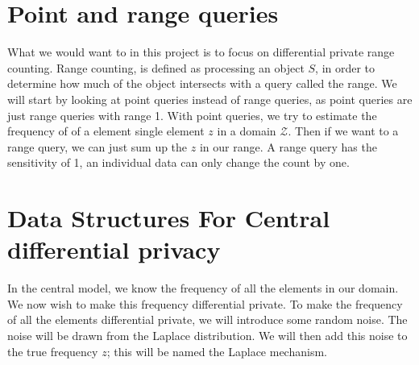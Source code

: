 \documentclass[11pt]{article}
\theoremstyle{definition}
\begin{document}
\section{Point and range queries}
What we would want to in this project is to focus on differential private range counting. Range counting, is defined as processing an object $S$, in order to determine how much of the object intersects with a query called the range. We will start by looking at point queries instead of range queries, as point queries are just range queries with range 1. With point queries, we try to estimate the frequency of of a element single element $z$ in a domain $\mathcal{Z}$. 
Then if we want to a range query, we can just sum up the $z$ in our range. A range query has the sensitivity of 1, an individual data can only change the count by one. 

\section{Data Structures For Central differential privacy}
In the central model, we know the frequency of all the elements in our domain. We now wish to make this frequency differential private. To make the frequency of all the elements differential private, we will introduce some random noise. The noise will be drawn from the Laplace distribution. We will then add this noise to the true frequency $z$; this will be named the Laplace mechanism.
\end{document}
